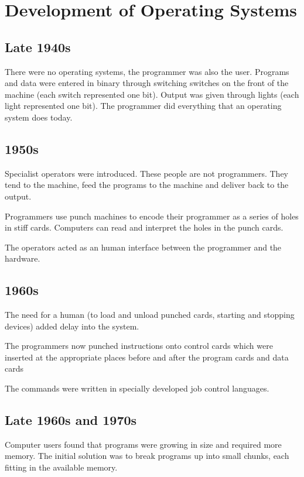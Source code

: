 
\section{Development of Operating Systems}

\subsection{Late 1940s}
There were no operating systems, the programmer was also the user. Programs and data were entered in binary through switching switches on the front of the machine (each switch represented one bit). Output was given through lights (each light represented one bit). The programmer did everything that an operating system does today.

\subsection{1950s}
Specialist operators were introduced. These people are not programmers. They tend to the machine, feed the programs to the machine and deliver back to the output.

Programmers use punch machines to encode their programmer as a series of holes in stiff cards. Computers can read and interpret the holes in the punch cards.

The operators acted as an human interface between the programmer and the hardware. 

\subsection{1960s}
The need for a human (to load and unload punched cards, starting and stopping devices) added delay into the system. 

The programmers now punched instructions onto control cards which were inserted at the appropriate places before and after the program cards and data cards

The commands were written in specially developed job control languages. 

\subsection{Late 1960s and 1970s}
Computer users found that programs were growing in size and required more memory. The initial solution was to break programs up into small chunks, each fitting in the available memory.

